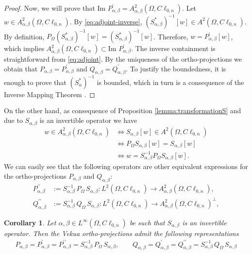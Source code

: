 \documentclass[12pt]{article}
\newtheorem{corollary}[theorem]{Corollary}
\begin{document}
\begin{proof}
Now, we will prove that $\text{Im } P_{\alpha,\beta}^{\prime}=A_{\alpha,\beta}^2(\Omega,C\ell_{0,n})$. Let $w\in A_{\alpha,\beta}^2(\Omega,C\ell_{0,n})$. By 
\eqref{eq:adjoint-inverse}, $(S_{\alpha,\beta}^*)^{-1}[w]\in A^2(\Omega,C\ell_{0,n})$. By definition, $P_{\Omega}(S_{\alpha,\beta}^*)^{-1}[w]=(S_{\alpha,\beta}^*)^{-1}[w]$. Therefore, $w=P_{\alpha,\beta}^{\prime}[w]$, which implies $A_{\alpha,\beta}^2(\Omega,C\ell_{0,n})\subset \text{Im } P_{\alpha,\beta}^{\prime}$. The inverse containment is straightforward from \eqref{eq:adjoint}. By the uniqueness of the ortho-projections we obtain that $P_{\alpha,\beta}=P_{\alpha,\beta}^{\prime}$ and $Q_{\alpha,\beta}=Q_{\alpha,\beta}^{\prime}$.
To justify the boundedness, it is enough to prove that $(S_{\alpha}^*)^{-1}$ is bounded, which in turn is a consequence of the Inverse Mapping Theorem \cite[Th.\ 1.1]{Kub2012}.
\end{proof}
On the other hand, as consequence of Proposition \ref{lemma:transformationS} and due to $S_{\alpha,\beta}$ is an invertible operator we have
\begin{align}\label{eq:fixed}
\nonumber w\in A_{\alpha,\beta}^2(\Omega,C\ell_{0,n}) &\Leftrightarrow S_{\alpha,\beta}[w]\in A^2(\Omega,C\ell_{0,n}) \\
\nonumber &\Leftrightarrow P_{\Omega} S_{\alpha,\beta}[w]= S_{\alpha,\beta}[w]\\ 
&\Leftrightarrow w=S_{\alpha,\beta}^{-1} P_{\Omega} S_{\alpha,\beta}[w].
\end{align}
We can easily see that the following operators are other equivalent expressions for the ortho-projections $P_{\alpha,\beta}$ and $Q_{\alpha,\beta}$:
\begin{align*}
P_{\alpha,\beta}^{\prime\prime}&:=S_{\alpha,\beta}^{-1} \,P_{\Omega} \,S_{\alpha,\beta}\colon L^2(\Omega,C\ell_{0,n}) \to A_{\alpha,\beta}^2(\Omega,C\ell_{0,n}),\\
Q_{\alpha,\beta}^{\prime\prime}&:=S_{\alpha,\beta}^{-1}\, Q_{\Omega} \,S_{\alpha,\beta}\colon L^2(\Omega,C\ell_{0,n}) \to A_{\alpha,\beta}^2(\Omega,C\ell_{0,n})^{\bot},
\end{align*} 
\begin{corollary}
Let $\alpha, \beta\in L^{\infty}(\Omega,C\ell_{0,n})$ be such that $S_{\alpha,\beta}$ is an invertible operator. Then the Vekua ortho-projections admit the following representations
\begin{align}\label{eq:projection2}
P_{\alpha,\beta}=P_{\alpha,\beta}^{\prime}=P_{\alpha,\beta}^{\prime\prime}=S_{\alpha,\beta}^{-1}\, P_{\Omega} \,S_{\alpha,\beta},\qquad Q_{\alpha,\beta}=Q_{\alpha,\beta}^{\prime}=Q_{\alpha,\beta}^{\prime\prime}=S_{\alpha,\beta}^{-1} \,Q_{\Omega}\, S_{\alpha,\beta}
\end{align}
\end{corollary}
\end{document}
